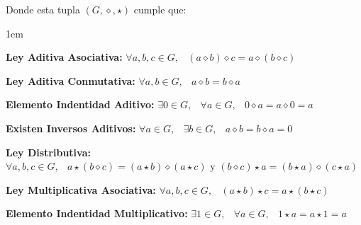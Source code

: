 \documentclass[12pt, fleqn]{report}                             %
\newenvironment{Indentation}[1][0.75em]                         %
        {\begin{adjustwidth}{#1}{}}                                 %
        {\end{adjustwidth}}                                         %
\DeclareMathOperator \Space     {\quad}                         %
\DeclareMathOperator \MiniSpace {\;}                            %
\theoremstyle{break}                                            %
\begin{document}
                Donde esta tupla $(G, \diamond, \star)$ cumple que:
                \begin{Indentation}[1em]
                \begin{itemize}
                \small{
                    
                    \item 
                        \textbf{Ley Aditiva Asociativa:}
                        $\forall a, b, c \in G, \MiniSpace
                            (a \diamond b) \diamond c = a \diamond (b \diamond c)$

                    \item 
                        \textbf{Ley Aditiva Conmutativa:}
                        $\forall a, b \in G, \MiniSpace a \diamond b = b \diamond a$


                    \item 
                        \textbf{Elemento Indentidad Aditivo:}
                        $\exists 0 \in G, \MiniSpace
                            \forall a \in G, \MiniSpace 0 \diamond a = a \diamond 0 = a$

                    \item 
                        \textbf{Existen Inversos Aditivos:}
                        $\forall a \in G, \MiniSpace
                                \exists b \in G, \MiniSpace
                                    a \diamond b = b \diamond a = 0$

                    \item
                        \textbf{Ley Distributiva:}
                        $\forall a, b, c \in G, \MiniSpace
                            a \star (b \diamond c) = (a \star b) \diamond (a \star c) 
                            \text{ y }
                            (b \diamond c)\star a = (b\star a) \diamond (c \star a)$

                    \item 
                        \textbf{Ley Multiplicativa Asociativa:}
                        $\forall a, b, c \in G, \MiniSpace
                            (a \star b) \star c = a \star (b \star c)$

                    \item 
                        \textbf{Elemento Indentidad Multiplicativo:}
                        $\exists 1 \in G, \MiniSpace
                            \forall a \in G, \MiniSpace 1 \star a = a \star 1 = a$

                }
                \end{itemize}
                \end{Indentation}
\end{document}
